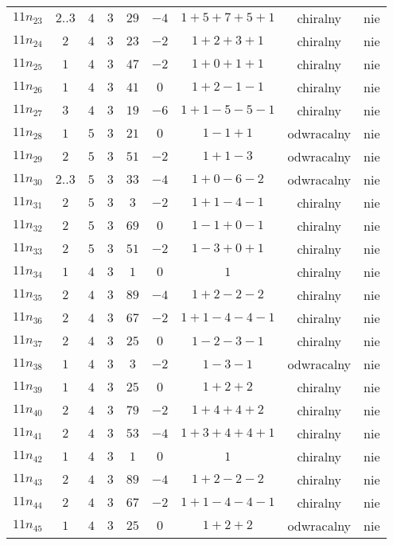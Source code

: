 \begin{longtable}{ccccccccc}
$11n_{23}$ & $2..3$ & $4$ & $3$ & $29$ & $-4$ & $1+5+7+5+1$ & chiralny & nie \\
$11n_{24}$ & $2$ & $4$ & $3$ & $23$ & $-2$ & $1+2+3+1$ & chiralny & nie \\
$11n_{25}$ & $1$ & $4$ & $3$ & $47$ & $-2$ & $1+0+1+1$ & chiralny & nie \\
$11n_{26}$ & $1$ & $4$ & $3$ & $41$ & $0$ & $1+2-1-1$ & chiralny & nie \\
$11n_{27}$ & $3$ & $4$ & $3$ & $19$ & $-6$ & $1+1-5-5-1$ & chiralny & nie \\
$11n_{28}$ & $1$ & $5$ & $3$ & $21$ & $0$ & $1-1+1$ & odwracalny & nie \\
$11n_{29}$ & $2$ & $5$ & $3$ & $51$ & $-2$ & $1+1-3$ & odwracalny & nie \\
$11n_{30}$ & $2..3$ & $5$ & $3$ & $33$ & $-4$ & $1+0-6-2$ & odwracalny & nie \\
$11n_{31}$ & $2$ & $5$ & $3$ & $3$ & $-2$ & $1+1-4-1$ & chiralny & nie \\
$11n_{32}$ & $2$ & $5$ & $3$ & $69$ & $0$ & $1-1+0-1$ & chiralny & nie \\
$11n_{33}$ & $2$ & $5$ & $3$ & $51$ & $-2$ & $1-3+0+1$ & chiralny & nie \\
$11n_{34}$ & $1$ & $4$ & $3$ & $1$ & $0$ & $1$ & chiralny & nie \\
$11n_{35}$ & $2$ & $4$ & $3$ & $89$ & $-4$ & $1+2-2-2$ & chiralny & nie \\
$11n_{36}$ & $2$ & $4$ & $3$ & $67$ & $-2$ & $1+1-4-4-1$ & chiralny & nie \\
$11n_{37}$ & $2$ & $4$ & $3$ & $25$ & $0$ & $1-2-3-1$ & chiralny & nie \\
$11n_{38}$ & $1$ & $4$ & $3$ & $3$ & $-2$ & $1-3-1$ & odwracalny & nie \\
$11n_{39}$ & $1$ & $4$ & $3$ & $25$ & $0$ & $1+2+2$ & chiralny & nie \\
$11n_{40}$ & $2$ & $4$ & $3$ & $79$ & $-2$ & $1+4+4+2$ & chiralny & nie \\
$11n_{41}$ & $2$ & $4$ & $3$ & $53$ & $-4$ & $1+3+4+4+1$ & chiralny & nie \\
$11n_{42}$ & $1$ & $4$ & $3$ & $1$ & $0$ & $1$ & chiralny & nie \\
$11n_{43}$ & $2$ & $4$ & $3$ & $89$ & $-4$ & $1+2-2-2$ & chiralny & nie \\
$11n_{44}$ & $2$ & $4$ & $3$ & $67$ & $-2$ & $1+1-4-4-1$ & chiralny & nie \\
$11n_{45}$ & $1$ & $4$ & $3$ & $25$ & $0$ & $1+2+2$ & odwracalny & nie \\

\end{longtable}
